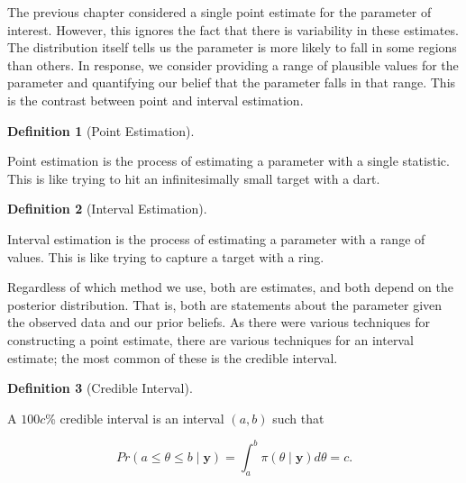 \documentclass[
  letterpaper,
  DIV=11,
  numbers=noendperiod]{scrreprt}
\theoremstyle{definition}
\theoremstyle{definition}
\newtheorem{definition}{Definition}[chapter]
\theoremstyle{plain}
\theoremstyle{remark}
\begin{document}
\providecommand{\norm}[1]{\lVert#1\rVert}
\providecommand{\abs}[1]{\lvert#1\rvert}
\providecommand{\iid}{\stackrel{\text{IID}}{\sim}}
\providecommand{\ind}{\stackrel{\text{Ind}}{\sim}}

\providecommand{\bm}[1]{\mathbf{#1}}
\providecommand{\bs}[1]{\boldsymbol{#1}}
\providecommand{\bbeta}{\bs{\beta}}

\providecommand{\Ell}{\mathcal{L}}
\providecommand{\indep}{\perp\negthickspace\negmedspace\perp}

The previous chapter considered a single point estimate for the
parameter of interest. However, this ignores the fact that there is
variability in these estimates. The distribution itself tells us the
parameter is more likely to fall in some regions than others. In
response, we consider providing a range of plausible values for the
parameter and quantifying our belief that the parameter falls in that
range. This is the contrast between point and interval estimation.

\begin{definition}[Point
Estimation]\protect\hypertarget{def-point-estimation}{}\label{def-point-estimation}

Point estimation is the process of estimating a parameter with a single
statistic. This is like trying to hit an infinitesimally small target
with a dart.

\end{definition}

\begin{definition}[Interval
Estimation]\protect\hypertarget{def-interval-estimation}{}\label{def-interval-estimation}

Interval estimation is the process of estimating a parameter with a
range of values. This is like trying to capture a target with a ring.

\end{definition}

Regardless of which method we use, both are estimates, and both depend
on the posterior distribution. That is, both are statements about the
parameter given the observed data and our prior beliefs. As there were
various techniques for constructing a point estimate, there are various
techniques for an interval estimate; the most common of these is the
credible interval.

\begin{definition}[Credible
Interval]\protect\hypertarget{def-credible-interval}{}\label{def-credible-interval}

A \(100c\)\% credible interval is an interval \((a, b)\) such that

\[Pr(a \leq \theta \leq b \mid \mathbf{y}) = \int_{a}^{b} \pi(\theta \mid \mathbf{y})d\theta = c.\]

\end{definition}
\end{document}
